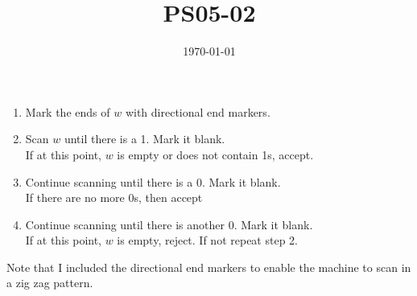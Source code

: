 \documentclass{article}
\title{PS05-02}
\date{\today}
\begin{document}
\maketitle

\begin{enumerate}
\item Mark the ends of $w$ with directional end markers.
\item Scan $w$ until there is a 1. Mark it blank.\\
If at this point, $w$ is empty or does not contain 1s, accept.
\item Continue scanning until there is a 0. Mark it blank.\\
If there are no more 0s, then accept
\item Continue scanning until there is another 0. Mark it blank. \\If at this point, $w$ is empty, reject. If not repeat step 2.  
\end{enumerate}
Note that I included the directional end markers to enable the machine to scan in a zig zag pattern.
\end{document}
